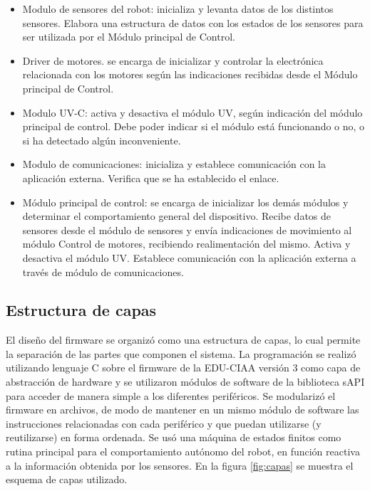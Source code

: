 \begin{itemize}
	\item Modulo de sensores del robot: inicializa y levanta datos de los distintos sensores. Elabora una estructura de datos con los estados de los sensores para ser utilizada por el Módulo principal de Control.
	\item Driver de motores. se encarga de inicializar y controlar la electrónica relacionada con los motores según las indicaciones recibidas desde el Módulo principal de Control.  
	\item Modulo UV-C: activa y desactiva el módulo UV, según indicación del módulo principal de control. Debe poder indicar si el módulo está funcionando o no, o si ha detectado algún inconveniente. 
	\item Modulo de comunicaciones: inicializa y establece comunicación con la aplicación externa. Verifica que se ha establecido el enlace.
	\item  Módulo principal de control: se encarga de inicializar los demás módulos y determinar el comportamiento general del dispositivo. Recibe datos de sensores desde el módulo de sensores y envía indicaciones de movimiento al módulo Control de motores, recibiendo realimentación del mismo. Activa y desactiva el módulo UV. Establece comunicación con la aplicación externa a través de módulo de comunicaciones.
\end{itemize}




\subsection{Estructura de capas}
El diseño del firmware se organizó como una estructura de capas, lo cual permite la separación de las partes que componen el sistema. 
La programación se realizó utilizando lenguaje C sobre el firmware de la EDU-CIAA versión 3 como capa de abstracción de hardware y se utilizaron módulos de software de la biblioteca sAPI para acceder de manera simple a los diferentes periféricos.
Se modularizó el firmware en archivos, de modo de mantener en un mismo módulo de software las instrucciones relacionadas con cada periférico y que puedan utilizarse (y reutilizarse) en forma ordenada. Se usó una máquina de estados finitos como rutina principal para el comportamiento autónomo del robot, en función reactiva a la información obtenida por los sensores.
En la figura \ref{fig:capas} se muestra el esquema de capas utilizado.

